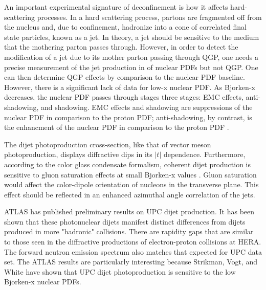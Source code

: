 An important experimental signature of deconfinement is how it affects hard-scattering processes. In a hard scattering process, partons are fragmented off from the nucleus and, due to confinement, hadronize into a cone of correlated final state particles, known as a jet. In theory, a jet should be sensitive to the medium that the mothering parton passes through. However, in order to detect the modification of a jet due to its mother parton passing through QGP, one needs a precise measurement of the jet production in of nuclear PDFs but not QGP. One can then determine QGP effects by comparison to the nuclear PDF baseline. However, there is a significant lack of data for low-x nuclear PDF. As Bjorken-x decreases, the nuclear PDF passes through stages three stages: EMC effects, anti-shadowing, and shadowing. EMC effects and shadowing are suppressions of the nuclear PDF in comparison to the proton PDF; anti-shadowing, by contrast, is the enhancment of the nuclear PDF in comparison to the proton PDF \cite{Strikman:2005yv}. 

The dijet photoproduction cross-section, like that of vector meson photoproduction, displays diffractive dips in its $|t|$ dependence. Furthermore, according to the color glass condensate formalism, coherent dijet production is sensitive to gluon saturation effects at small Bjorken-x values \cite{Guzey:2016awf}\cite{Guzey:2016tek}. Gluon saturation would affect the color-dipole orientation of nucleons in the transverse plane. This effect should be reflected in an enhanced azimuthal angle correlation of the jets. 

ATLAS has published preliminary results on UPC dijet production. It has been shown that these photonuclear dijets manifest distinct differences from dijets produced in more "hadronic" collisions. There are rapidity gaps that are similar to those seen in the diffractive productions of electron-proton collisions at HERA. The forward neutron emission spectrum also matches that expected for UPC data set. The ATLAS results are particularly interesting because Strikman, Vogt, and White have shown that UPC dijet photoproduction is sensitive to the low Bjorken-x nuclear PDFs.

